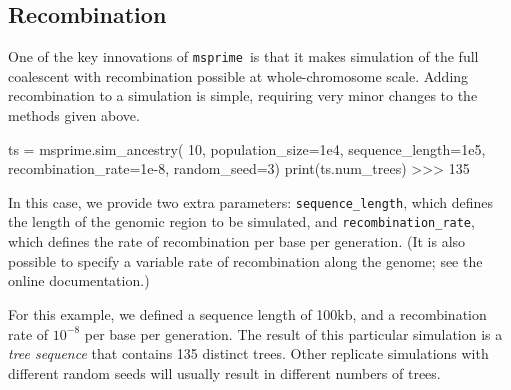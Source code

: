 \documentclass[graybox]{svmult}
\newcommand{\msprime}[0]{\texttt{msprime}}
\begin{document}




\subsection{Recombination}\label{recombination}

One of the key innovations of \msprime\ is that it makes simulation of the
full coalescent with recombination possible at whole-chromosome scale.
Adding recombination to a simulation is simple, requiring very minor
changes to the methods given above.

\begin{pythoncode}
ts = msprime.sim_ancestry(
    10, population_size=1e4, sequence_length=1e5,
    recombination_rate=1e-8, random_seed=3)
print(ts.num_trees)
>>> 135
\end{pythoncode}

In this case, we provide two extra parameters: \texttt{sequence\_length}, which
defines the length of the genomic region to be simulated, and
\texttt{recombination\_rate}, which defines the rate of recombination
per base per generation. (It is also possible to specify a variable
rate of recombination along the genome; see the online documentation.)

For this example, we defined a sequence length of 100kb, and a recombination rate of
\(10^{-8}\) per base per generation. The result of this particular simulation is a
\emph{tree sequence} that contains 135 distinct trees. Other replicate
simulations with different random seeds will usually result in different
numbers of trees.
\end{document}
